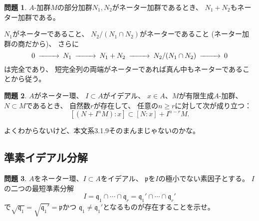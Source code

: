 \documentclass[uplatex]{jsarticle}
\makeatletter
\theoremstyle{definition}
\newtheorem{prob}[prob]{問題}
\renewenvironment{proof}[1][\proofname]{
  \pushQED{\qed}%
  \normalfont \topsep6\p@\@plus6\p@\relax
  \trivlist
  \item[\hskip\labelsep
    #1\@addpunct{\textbf{.}}]\ignorespaces
}{%
  \popQED\endtrivlist\@endpefalse
}
\providecommand{\proofname}{証明}
\newcommand\mfp{\mathfrak{p}}
\newcommand\mfq{\mathfrak{q}}
\makeatother
\begin{document}
\begin{prob}\label{3.0.2}
  \(A\)-加群\(M\)の部分加群\(N_1,N_2\)がネーター加群であるとき、
  \(N_1+N_2\)もネーター加群である。
\end{prob}

\begin{proof}
  \(N_1\)がネーターであること、
  \(N_2/(N_1\cap N_2)\)がネーターであること (ネーター加群の商だから)、
  さらに
  \[
  \begin{CD}
    0 @>>> N_1 @>>> N_1+N_2 @>>> N_2/(N_1\cap N_2) @>>> 0
  \end{CD}
  \]
  は完全であり、
  短完全列の両端がネーターであれば真ん中もネーターであることから従う。
\end{proof}


\begin{prob}\label{3.0.3}
  \(A\)がネーター環、
  \(I\subset A\)がイデアル、
  \(x\in A\)、\(M\)が有限生成\(A\)-加群、
  \(N\subset M\)であるとき、
  自然数\(r\)が存在して、
  任意の\(n\geq r\)に対して次が成り立つ：
  \[
  [(N+I^nM) : x] \subset [N:x] + I^{n-r}M.
  \]
\end{prob}

\begin{proof}
  よくわからないけど、本文系3.1.9そのまんまじゃないのかな。
\end{proof}


\subsection{準素イデアル分解}


\begin{prob}\label{3.1.1}
  \(A\)をネーター環、\(I\subset A\)をイデアル、
  \(\mfp\)を\(I\)の極小でない素因子とする。
  \(I\)の二つの最短準素分解
  \[
  I = \mfq_1 \cap \cdots \cap \mfq_r
  = \mfq_1' \cap \cdots \cap \mfq_r'
  \]
  で\(\sqrt{\mfq_1} = \sqrt{\mfq_1'} = \mfp\)かつ
  \(\mfq_1 \neq \mfq_1'\)となるものが存在することを示せ。
\end{prob}

\begin{proof}

\end{proof}
\end{document}
